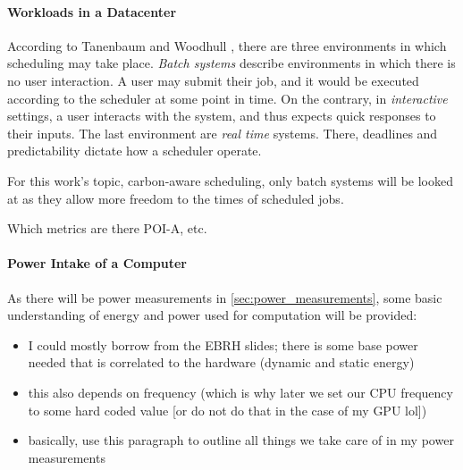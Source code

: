 \paragraph{Workloads in a Datacenter} According to Tanenbaum and Woodhull \cite{tanenbaum_operating_2006}, there are three environments in which scheduling may take place. \emph{Batch systems} describe environments in which there is no user interaction.
A user may submit their job, and it would be executed according to the scheduler at some point in time. 
On the contrary, in \emph{interactive} settings, a user interacts with the system, and thus expects quick responses to their inputs. 
The last environment are \emph{real time} systems. There, deadlines and predictability dictate how a scheduler operate.

For this work's topic, carbon-aware scheduling, only batch systems will be looked at as they allow more freedom to the times of scheduled jobs. 


Which metrics are there POI-A, etc.

\paragraph{Power Intake of a Computer}
As there will be power measurements in \ref{sec:power_measurements}, some basic understanding of energy and power used for computation will be provided:
\begin{itemize}
    \item I could mostly borrow from the EBRH slides; there is some base power needed that is correlated to the hardware (dynamic and static energy)
    \item this also depends on frequency (which is why later we set our CPU frequency to some hard coded value [or do not do that in the case of my GPU lol])
    \item basically, use this paragraph to outline all things we take care of in my power measurements
\end{itemize}